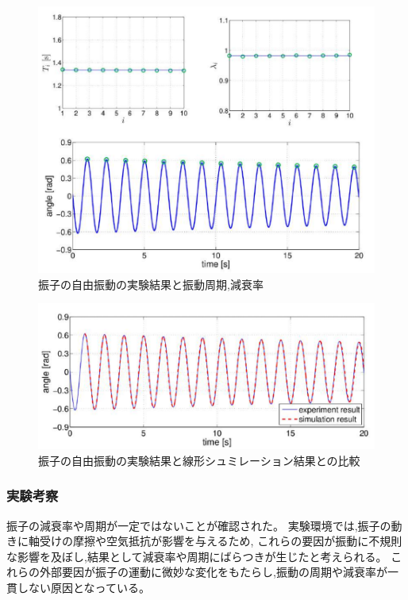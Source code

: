 \newpage

\begin{figure}[H]
  \centering
  \includegraphics[scale=0.7]{sozai/8.pdf}
  \caption{振子の自由振動の実験結果と振動周期,減衰率}
\end{figure}

\begin{figure}[H]
  \centering
  \includegraphics[scale=0.7]{sozai/9.pdf}
  \caption{振子の自由振動の実験結果と線形シュミレーション結果との比較}
\end{figure}


\subsubsection{実験考察}

振子の減衰率や周期が一定ではないことが確認された。
実験環境では,振子の動きに軸受けの摩擦や空気抵抗が影響を与えるため,
これらの要因が振動に不規則な影響を及ぼし,結果として減衰率や周期にばらつきが生じたと考えられる。
これらの外部要因が振子の運動に微妙な変化をもたらし,振動の周期や減衰率が一貫しない原因となっている。

